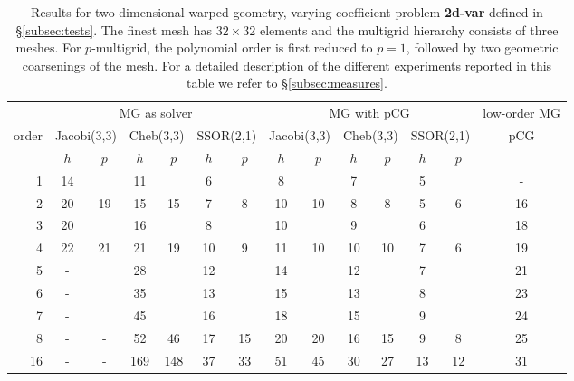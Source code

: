 \documentclass[smallcondensed,final]{svjour3}     %
\begin{document}
\begin{table}
  \caption{\label{tab:2d-fan} Results for two-dimensional
    warped-geometry, varying coefficient problem {\bf 2d-var} defined
    in \S\ref{subsec:tests}.  The finest
    mesh has $32\times 32$ elements and the multigrid hierarchy
    consists of three meshes.  For $p$-multigrid, the
    polynomial order is first reduced to $p=1$, followed by two
    geometric coarsenings of the mesh.
    For a
    detailed description of the different experiments reported in this
    table we refer to \S\ref{subsec:measures}.}  \centering
  \begin{tabular}{|r|c c|c c|c c||c c|c c|c c||c|} 
    \hline
    & \multicolumn{6}{c||}{MG as solver} & \multicolumn{6}{c||}{MG
      with pCG} & \!\!low-order MG\!\! \\
    \cline{2-13}
    \!\!\! order \!\!\!\! &  \multicolumn{2}{c|}{\!\!\scriptsize  Jacobi(3,3)\!\!} &  \multicolumn{2}{c|}{\!\!\scriptsize Cheb(3,3)\!\!} & \multicolumn{2}{c||}{\!\!\scriptsize  SSOR(2,1)\!\!} & \multicolumn{2}{c|}{\!\!\scriptsize Jacobi(3,3)\!\!} &  \multicolumn{2}{c|}{\!\!\scriptsize Cheb(3,3)\!\!} & \multicolumn{2}{c||}{\!\!\scriptsize SSOR(2,1)\!\!} & pCG\\
\hline
 & $h$ & $p$ & $h$ & $p$& $h$ & $p$& $h$ & $p$& $h$ & $p$& $h$ & $p$& ~ \\
 \cline{2-13}
1 & 14 & & 11 & & 6 & & 8 & & 7 & & 5 & & -   \\
2 & 20 & 19 & 15 & 15 & 7 & 8 & 10 & 10 & 8 & 8 & 5 & 6 & 16   \\
3 & 20 & & 16 & & 8 & & 10 & & 9 & & 6 & & 18  \\
4 & 22 & 21 & 21 & 19 & 10 & 9 & 11 & 10 & 10 & 10 & 7 & 6 & 19 \\
5 & -  & & 28 & & 12 & & 14 & & 12 & & 7 & & 21   \\
6 & -  & & 35 & & 13 & & 15 & & 13 & & 8 & & 23  \\
7 & -  & & 45 & & 16 & & 18 & & 15 & & 9 & & 24  \\
8 & -  & - & 52 & 46 & 17 & 15 & 20 & 20 & 16 & 15 & 9 & 8 & 25  \\
16 & - & - & 169 & 148 & 37 & 33 & 51 & 45 & 30 & 27 & 13 & 12 & 31 \\
\hline
  \end{tabular}
\end{table}
\end{document}
